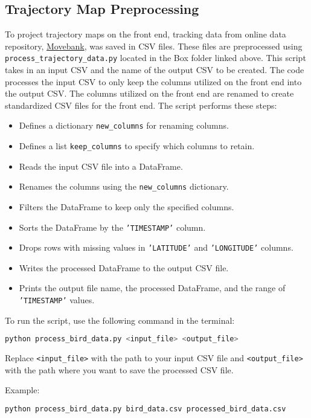 \documentclass{article}
\begin{document}
\subsection{Trajectory Map Preprocessing}
To project trajectory maps on the front end, tracking data from online data repository, \href{https://www.movebank.org/cms/movebank-main} {Movebank}, was saved in CSV files. These files are preprocessed using \texttt{process\_trajectory\_data.py} located in the Box folder linked above. This script takes in an input CSV and the name of the output CSV to be created.
The code processes the input CSV to only keep the columns utilized on the front end into the output CSV. The columns utilized on the front end are renamed to create standardized CSV files for the front end. The script performs these steps:
\begin{itemize}
    \item Defines a dictionary \texttt{new\_columns} for renaming columns.
    \item Defines a list \texttt{keep\_columns} to specify which columns to retain.
    \item Reads the input CSV file into a DataFrame.
    \item Renames the columns using the \texttt{new\_columns} dictionary.
    \item Filters the DataFrame to keep only the specified columns.
    \item Sorts the DataFrame by the \texttt{'TIMESTAMP'} column.
    \item Drops rows with missing values in \texttt{'LATITUDE'} and \texttt{'LONGITUDE'} columns.
    \item Writes the processed DataFrame to the output CSV file.
    \item Prints the output file name, the processed DataFrame, and the range of \texttt{'TIMESTAMP'} values.
\end{itemize}

To run the script, use the following command in the terminal:

\begin{lstlisting}[language=bash]
python process_bird_data.py <input_file> <output_file>
\end{lstlisting}

Replace \texttt{<input\_file>} with the path to your input CSV file and \texttt{<output\_file>} with the path where you want to save the processed CSV file.

Example:

\begin{lstlisting}[language=bash]
python process_bird_data.py bird_data.csv processed_bird_data.csv
\end{lstlisting}
\end{document}
